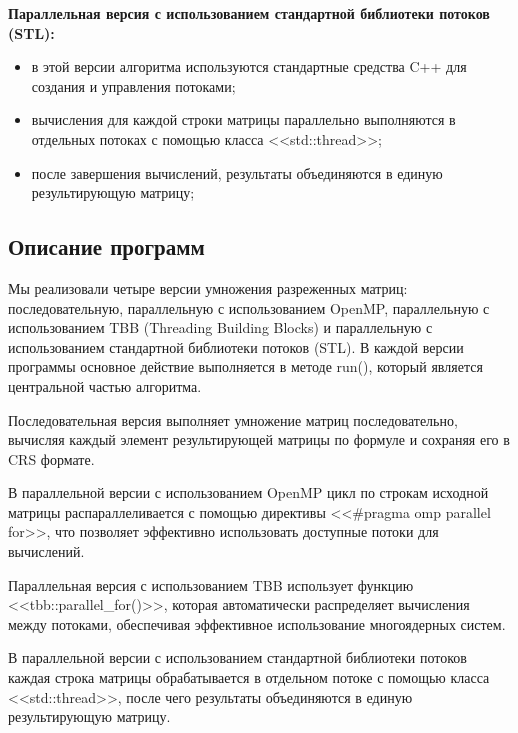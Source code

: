\documentclass[a4paper, 14pt]{article}
\begin{document}
	\textbf{Параллельная версия с использованием стандартной библиотеки потоков (STL):}
	\vspace{-1em}
	\begin{itemize}[leftmargin=3em]
		\setlength\itemsep{0cm}
		\item в этой версии алгоритма используются стандартные средства C++ для создания и управления потоками;
		\item вычисления для каждой строки матрицы параллельно выполняются в отдельных потоках с помощью класса <<std::thread>>;
		\item после завершения вычислений, результаты объединяются в единую результирующую матрицу;
	\end{itemize}
	
	
	\newpage
	\subsection*{\centering Описание программ}
	Мы реализовали четыре версии умножения разреженных матриц: последовательную, параллельную с использованием OpenMP, параллельную с использованием TBB (Threading Building Blocks) и параллельную с использованием стандартной библиотеки потоков (STL). В каждой версии программы основное действие выполняется в методе run(), который является центральной частью алгоритма.
	
	Последовательная версия выполняет умножение матриц последовательно, вычисляя каждый элемент результирующей матрицы по формуле и сохраняя его в CRS формате.
	
	В параллельной версии с использованием OpenMP цикл по строкам исходной матрицы распараллеливается с помощью директивы <<\#pragma omp parallel for>>, что позволяет эффективно использовать доступные потоки для вычислений.
	
	Параллельная версия с использованием TBB использует функцию <<tbb::parallel\_for()>>, которая автоматически распределяет вычисления между потоками, обеспечивая эффективное использование многоядерных систем.
	
	В параллельной версии с использованием стандартной библиотеки потоков каждая строка матрицы обрабатывается в отдельном потоке с помощью класса <<std::thread>>, после чего результаты объединяются в единую результирующую матрицу.
	
\end{document}
